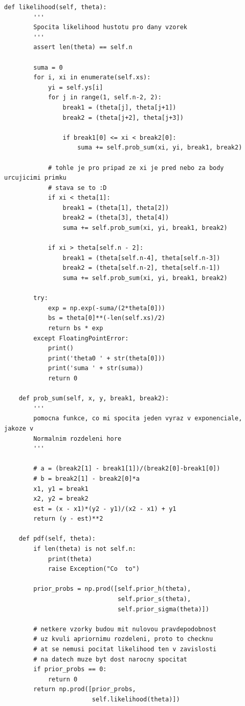 \documentclass[czech,master,public,dept470,male,cpdeclaration,oneside, python]{diploma}
\begin{document}
\begin{lstlisting}[label=blr, caption=Blr]
    def likelihood(self, theta):
        '''
        Spocita likelihood hustotu pro dany vzorek
        '''
        assert len(theta) == self.n

        suma = 0
        for i, xi in enumerate(self.xs):
            yi = self.ys[i]
            for j in range(1, self.n-2, 2):
                break1 = (theta[j], theta[j+1])
                break2 = (theta[j+2], theta[j+3])

                if break1[0] <= xi < break2[0]:
                    suma += self.prob_sum(xi, yi, break1, break2)

            # tohle je pro pripad ze xi je pred nebo za body urcujicimi primku
            # stava se to :D
            if xi < theta[1]:
                break1 = (theta[1], theta[2])
                break2 = (theta[3], theta[4])
                suma += self.prob_sum(xi, yi, break1, break2)

            if xi > theta[self.n - 2]:
                break1 = (theta[self.n-4], theta[self.n-3])
                break2 = (theta[self.n-2], theta[self.n-1])
                suma += self.prob_sum(xi, yi, break1, break2)

        try:
            exp = np.exp(-suma/(2*theta[0]))
            bs = theta[0]**(-len(self.xs)/2)
            return bs * exp
        except FloatingPointError:
            print()
            print('theta0 ' + str(theta[0]))
            print('suma ' + str(suma))
            return 0

    def prob_sum(self, x, y, break1, break2):
        '''
        pomocna funkce, co mi spocita jeden vyraz v exponenciale, jakoze v
        Normalnim rozdeleni hore
        '''

        # a = (break2[1] - break1[1])/(break2[0]-break1[0])
        # b = break2[1] - break2[0]*a
        x1, y1 = break1
        x2, y2 = break2
        est = (x - x1)*(y2 - y1)/(x2 - x1) + y1
        return (y - est)**2

    def pdf(self, theta):
        if len(theta) is not self.n:
            print(theta)
            raise Exception("Co  to")

        prior_probs = np.prod([self.prior_h(theta),
                               self.prior_s(theta),
                               self.prior_sigma(theta)])

        # netkere vzorky budou mit nulovou pravdepodobnost
        # uz kvuli apriornimu rozdeleni, proto to checknu
        # at se nemusi pocitat likelihood ten v zavislosti
        # na datech muze byt dost narocny spocitat
        if prior_probs == 0:
            return 0
        return np.prod([prior_probs,
                        self.likelihood(theta)])


\end{lstlisting}
\end{document}
